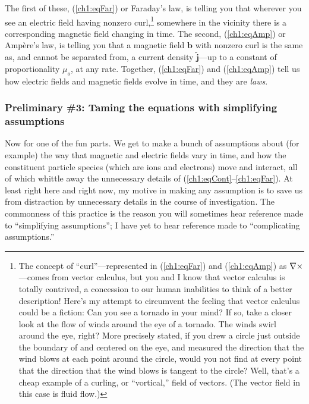 The first of these, (\ref{ch1:eqFar}) or Faraday's law, is telling you that
wherever you see an electric field having nonzero curl,\footnote{The concept of
  ``curl''---represented in (\ref{ch1:eqFar}) and (\ref{ch1:eqAmp}) as ${\bf \nabla}
  \times$---comes from vector calculus, but you and I know that vector calculus
  is totally contrived, a concession to our human inabilities to think of a
  better description! Here's my attempt to circumvent the feeling that vector
  calculus could be a fiction: Can you see a tornado in your mind? If so, take a
  closer look at the flow of winds around the eye of a tornado. The winds swirl
  around the eye, right? More precisely stated, if you drew a circle just
  outside the boundary of and centered on the eye, and measured the direction
  that the wind blows at each point around the circle, would you not find at
  every point that the direction that the wind blows is tangent to the circle?
  Well, that's a cheap example of a curling, or ``vortical,'' field of
  vectors. (The vector field in this case is fluid flow.)  } somewhere in the
vicinity there is a corresponding magnetic field changing in time. The second,
(\ref{ch1:eqAmp}) or Amp\`{e}re's law, is telling you that a magnetic field
$\mathbf{b}$ with nonzero curl is the same as, and cannot be separated from, a
current density $\mathbf{\tilde j}$---up to a constant of proportionality
$\mu_o$, at any rate. Together, (\ref{ch1:eqFar}) and (\ref{ch1:eqAmp}) tell us
how electric fields and magnetic fields evolve in time, and they are
\emph{laws}.

\subsubsection{Preliminary \#3: Taming the equations with simplifying assumptions} \label{ch1:sssAssume}

Now for one of the fun parts. We get to make a bunch of assumptions about (for
example) the way that magnetic and electric fields vary in time, and how the
constituent particle species (which are ions and electrons) move and interact,
all of which whittle away the unnecessary details of
(\ref{ch1:eqCont}--\ref{ch1:eqFar}). At least right here and right now, my
motive in making any assumption is to save us from distraction by unnecessary
details in the course of investigation. The commonness of this practice is the
reason you will sometimes hear reference made to ``simplifying assumptions''; I
have yet to hear reference made to ``complicating assumptions.''

